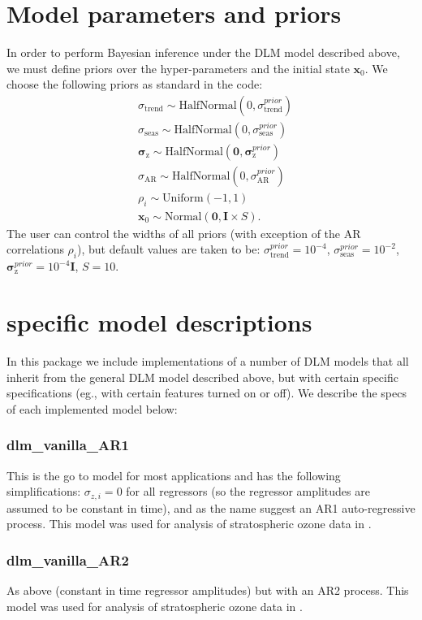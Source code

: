 \documentclass[a4paper, oneside, final]{scrartcl}
\begin{document}
\section{Model parameters and priors}
%
In order to perform Bayesian inference under the DLM model described above, we must define priors over the hyper-parameters and the
initial state $\mathbf{x}_0$. We choose the following priors as standard in the code:
\begin{align}
&\sigma_\mathrm{trend} \sim \mathrm{HalfNormal}(0, \sigma_\mathrm{trend}^{prior}) \nonumber \\
&\sigma_\mathrm{seas} \sim \mathrm{HalfNormal}(0, \sigma_\mathrm{seas}^{prior}) \nonumber \\
&\boldsymbol{\sigma}_\mathrm{z} \sim \mathrm{HalfNormal}(\mathbf{0}, \boldsymbol{\sigma}_\mathrm{z}^{prior}) \nonumber \\
&\sigma_\mathrm{AR} \sim \mathrm{HalfNormal}(0, \sigma_\mathrm{AR}^{prior}) \nonumber \\
&\rho_i  \sim \mathrm{Uniform}(-1, 1) \nonumber \\
&\mathbf{x}_0 \sim \mathrm{Normal}(\mathbf{0}, \mathbf{I}\times S).
\end{align}
The user can control the widths of all priors (with exception of the AR correlations $\rho_i$), but default values are taken to be: $\sigma_\mathrm{trend}^{prior} = 10^{-4}$, $\sigma_\mathrm{seas}^{prior} = 10^{-2}$, $\boldsymbol{\sigma}_\mathrm{z}^{prior} = 10^{-4}\mathbf{I}$, $S=10$.
%
\section{specific model descriptions}
%
In this package we include implementations of a number of DLM models that all inherit from the general DLM model described above, but with certain specific specifications (eg., with certain features turned on or off). We describe the specs of each implemented model below:
%
\subsubsection*{dlm\_vanilla\_AR1}
This is the go to model for most applications and has the following simplifications: $\sigma_{z,i} = 0$ for all regressors (so the regressor amplitudes are assumed to be constant in time), and as the name suggest an AR1 auto-regressive process. This model was used for analysis of stratospheric ozone data in \citet{ball2017}.
%
\subsubsection*{dlm\_vanilla\_AR2}
As above (constant in time regressor amplitudes) but with an AR2 process. This model was used for analysis of stratospheric ozone data in \citet{ball2018}.
%
\end{document}
